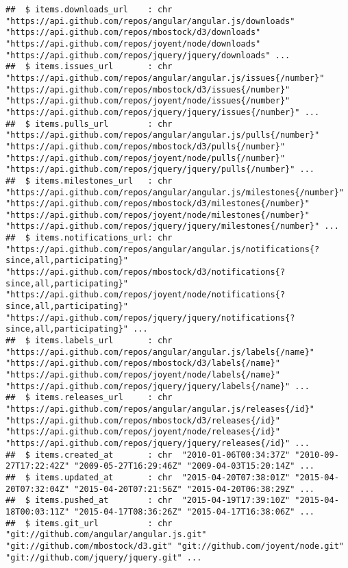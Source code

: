 \documentclass{article}\usepackage[]{graphicx}\usepackage[]{color}
\makeatletter
\newenvironment{kframe}{%
 \def\at@end@of@kframe{}%
 \ifinner\ifhmode%
  \def\at@end@of@kframe{\end{minipage}}%
  \begin{minipage}{\columnwidth}%
 \fi\fi%
 \def\FrameCommand##1{\hskip\@totalleftmargin \hskip-\fboxsep
 \colorbox{shadecolor}{##1}\hskip-\fboxsep
     \hskip-\linewidth \hskip-\@totalleftmargin \hskip\columnwidth}%
 \MakeFramed {\advance\hsize-\width
   \@totalleftmargin\z@ \linewidth\hsize
   \@setminipage}}%
 {\par\unskip\endMakeFramed%
 \at@end@of@kframe}
\newenvironment{knitrout}{}{} %
\makeatother
\begin{document}
\begin{knitrout}
\begin{kframe}
\begin{verbatim}
##  $ items.downloads_url    : chr  "https://api.github.com/repos/angular/angular.js/downloads" "https://api.github.com/repos/mbostock/d3/downloads" "https://api.github.com/repos/joyent/node/downloads" "https://api.github.com/repos/jquery/jquery/downloads" ...
##  $ items.issues_url       : chr  "https://api.github.com/repos/angular/angular.js/issues{/number}" "https://api.github.com/repos/mbostock/d3/issues{/number}" "https://api.github.com/repos/joyent/node/issues{/number}" "https://api.github.com/repos/jquery/jquery/issues{/number}" ...
##  $ items.pulls_url        : chr  "https://api.github.com/repos/angular/angular.js/pulls{/number}" "https://api.github.com/repos/mbostock/d3/pulls{/number}" "https://api.github.com/repos/joyent/node/pulls{/number}" "https://api.github.com/repos/jquery/jquery/pulls{/number}" ...
##  $ items.milestones_url   : chr  "https://api.github.com/repos/angular/angular.js/milestones{/number}" "https://api.github.com/repos/mbostock/d3/milestones{/number}" "https://api.github.com/repos/joyent/node/milestones{/number}" "https://api.github.com/repos/jquery/jquery/milestones{/number}" ...
##  $ items.notifications_url: chr  "https://api.github.com/repos/angular/angular.js/notifications{?since,all,participating}" "https://api.github.com/repos/mbostock/d3/notifications{?since,all,participating}" "https://api.github.com/repos/joyent/node/notifications{?since,all,participating}" "https://api.github.com/repos/jquery/jquery/notifications{?since,all,participating}" ...
##  $ items.labels_url       : chr  "https://api.github.com/repos/angular/angular.js/labels{/name}" "https://api.github.com/repos/mbostock/d3/labels{/name}" "https://api.github.com/repos/joyent/node/labels{/name}" "https://api.github.com/repos/jquery/jquery/labels{/name}" ...
##  $ items.releases_url     : chr  "https://api.github.com/repos/angular/angular.js/releases{/id}" "https://api.github.com/repos/mbostock/d3/releases{/id}" "https://api.github.com/repos/joyent/node/releases{/id}" "https://api.github.com/repos/jquery/jquery/releases{/id}" ...
##  $ items.created_at       : chr  "2010-01-06T00:34:37Z" "2010-09-27T17:22:42Z" "2009-05-27T16:29:46Z" "2009-04-03T15:20:14Z" ...
##  $ items.updated_at       : chr  "2015-04-20T07:38:01Z" "2015-04-20T07:32:04Z" "2015-04-20T07:21:56Z" "2015-04-20T06:38:29Z" ...
##  $ items.pushed_at        : chr  "2015-04-19T17:39:10Z" "2015-04-18T00:03:11Z" "2015-04-17T08:36:26Z" "2015-04-17T16:38:06Z" ...
##  $ items.git_url          : chr  "git://github.com/angular/angular.js.git" "git://github.com/mbostock/d3.git" "git://github.com/joyent/node.git" "git://github.com/jquery/jquery.git" ...

\end{verbatim}
\end{kframe}
\end{knitrout}
\end{document}
